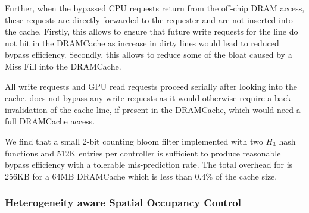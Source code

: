 Further, when the bypassed CPU requests return from the off-chip DRAM access, these requests are directly forwarded to the requester and are not inserted into the cache. 
Firstly, this allows \bypassname to ensure that future write requests for the line do not hit in the DRAMCache as increase in dirty lines would lead to reduced bypass efficiency. 
Secondly, this allows \bypassname to reduce some of the bloat caused by a Miss Fill \cite{bear} into the DRAMCache.
\par All write requests and GPU read requests proceed serially after looking into the cache. \bypassname does not bypass any write requests as it would otherwise require a back-invalidation of the cache line, if present in the DRAMCache, which would need a full DRAMCache access.
\par We find that a small 2-bit counting bloom filter implemented with two $H_3$ hash functions \cite{h3} and 512K entries per controller is sufficient 
to produce reasonable bypass efficiency with a tolerable mis-prediction rate. The total overhead for \bypassname is 256KB for a 64MB DRAMCache which is less than 0.4\% of the cache size.


\subsubsection{\hspace{-0.6em}Heterogeneity aware Spatial Occupancy Control} \label{mechanism-chaining}

